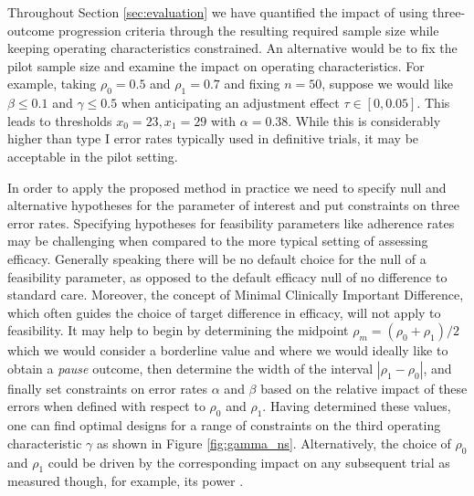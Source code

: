\documentclass{bmcart}
\begin{document}
Throughout Section \ref{sec:evaluation} we have quantified the impact of using three-outcome progression criteria through the resulting required sample size while keeping operating characteristics constrained. An alternative would be to fix the pilot sample size and examine the impact on operating characteristics. For example, taking $\rho_0 = 0.5$ and $\rho_1 = 0.7$ and fixing $n = 50$, suppose we would like $\beta \leq 0.1$ and $\gamma \leq 0.5$ when anticipating an adjustment effect $\tau \in [0, 0.05]$. This leads to thresholds $x_0 = 23, x_1 = 29$ with $\alpha = 0.38$. While this is considerably higher than type I error rates typically used in definitive trials, it may be acceptable in the pilot setting.


In order to apply the proposed method in practice we need to specify null and alternative hypotheses for the parameter of interest and put constraints on three error rates. Specifying hypotheses for feasibility parameters like adherence rates may be challenging when compared to the more typical setting of assessing efficacy. Generally speaking there will be no default choice for the null of a feasibility parameter, as opposed to the default efficacy null of no difference to standard care. Moreover, the concept of Minimal Clinically Important Difference, which often guides the choice of target difference in efficacy, will not apply to  feasibility. It may help to begin by determining the midpoint $\rho_m = (\rho_0 + \rho_1)/2$ which we would consider a borderline value and where we would ideally like to obtain a \emph{pause} outcome, then determine the width of the interval $|\rho_1 - \rho_0|$, and finally set constraints on error rates $\alpha$ and $\beta$ based on the relative impact of these errors when defined with respect to $\rho_0$ and $\rho_1$. Having determined these values, one can find optimal designs for a range of constraints on the third operating characteristic $\gamma$ as shown in Figure \ref{fig:gamma_ns}. Alternatively, the choice of $\rho_0$ and $\rho_1$ could be driven by the corresponding impact on any subsequent trial as measured though, for example, its power \cite{Wilson2021a}.
\end{document}

